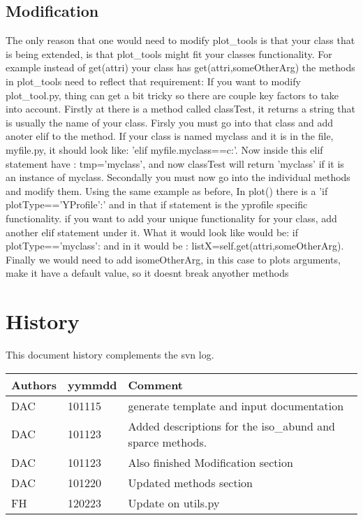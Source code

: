 \subsection{Modification}
The only reason that one would need to modify plot\_tools is that your class that is being extended, is that plot\_tools might fit your classes functionality.  For example
instead of get(attri) your class has get(attri,someOtherArg) the methods in plot\_tools need to reflect that requirement:
If you want to modify plot\_tool.py, thing can get a bit tricky so there are couple key factors to take into account.
Firstly at there is a method called classTest, it returns a string that is usually the name of your class.  Firsly you must go into that class
and add anoter elif to the method.  If your class is named myclass and it is in the file, myfile.py, it should look like: 
'elif myfile.myclass==c:'. Now inside this elif statement have : tmp='myclass', and now classTest will return 'myclass' if it is 
an instance of myclass.\newline
Secondally you must now go into the individual methods and modify them.  Using the same example as before,
In plot() there is a 'if plotType=='YProfile':' and in that if statement is the yprofile specific functionality. 
if you want to add your unique functionality for your class, add another elif statement under it.
What it would look like would be: if plotType=='myclass': and in it would be : listX=self.get(attri,someOtherArg).\newline
Finally we would need to add isomeOtherArg, in this case to plots arguments, make it have a default value, so it doesnt break anyother methods

\section{History} 
This document history complements the svn log.

\begin{tabular*}{\textwidth}{lll}
\hline
Authors & yymmdd & Comment \\
\hline
DAC & 101115 & generate template and input documentation\\
DAC & 101123 & Added descriptions for the iso\_abund and sparce methods.\\
DAC & 101123 & Also finished Modification section\\
DAC & 101220 & Updated methods section\\
FH & 120223 & Update on utils.py\\
\hline
\end{tabular*}
